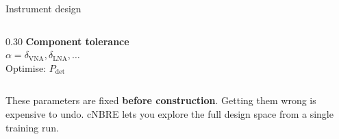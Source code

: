 \documentclass[aspectratio=169]{beamer}
\newcommand{\pdet}{\ensuremath{P_{\mathrm{det}}}}
\begin{document}
\begin{frame}{\small{Instrument design}}
\begin{columns}[c,onlytextwidth]
\begin{column}{0.30\textwidth}
\vspace{0.15cm}
{\scriptsize \textbf{Component tolerance}}\\
{\scriptsize $\alpha = \delta_{\mathrm{VNA}}, \delta_{\mathrm{LNA}}, \ldots$}\\[2pt]
{\scriptsize Optimise: $\pdet$}
\end{column}
\end{columns}

\vfill
\begin{tcolorbox}[keybox]
\small
These parameters are fixed \textbf{before construction}. Getting them wrong is expensive to undo. cNBRE lets you explore the full design space from a single training run.
\end{tcolorbox}
\end{frame}

\end{document}

